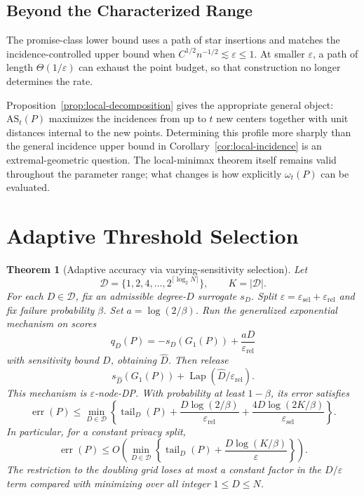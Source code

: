 \documentclass[11pt]{article}
\newtheorem{theorem}{Theorem}[section]
\DeclareMathOperator{\Lap}{Lap}
\newcommand{\eps}{\varepsilon}
\newcommand{\calD}{\mathcal{D}}
\newcommand{\tail}{\operatorname{tail}}
\begin{document}
\subsection{Beyond the Characterized Range}
The promise-class lower bound uses a path of star insertions and matches the incidence-controlled upper bound when \(C^{1/2}n^{-1/2}\lesssim\eps\le1\). At smaller \(\eps\), a path of length \(\Theta(1/\eps)\) can exhaust the point budget, so that construction no longer determines the rate.

Proposition~\ref{prop:local-decomposition} gives the appropriate general object: \(\mathrm{AS}_t(P)\) maximizes the incidences from up to \(t\) new centers together with unit distances internal to the new points. Determining this profile more sharply than the general incidence upper bound in Corollary~\ref{cor:local-incidence} is an extremal-geometric question. The local-minimax theorem itself remains valid throughout the parameter range; what changes is how explicitly \(\omega_t(P)\) can be evaluated.


\section{Adaptive Threshold Selection}
\label{sec:adaptive-selection}

\begin{theorem}[Adaptive accuracy via varying-sensitivity selection]
\label{thm:adaptive}
Let
\[
\calD=\{1,2,4,\ldots,2^{\lceil\log_2 N\rceil}\},\qquad K=|\calD|.
\]
For each \(D\in\calD\), fix an admissible degree-\(D\) surrogate \(s_D\). Split \(\eps=\eps_{\mathrm{sel}}+\eps_{\mathrm{rel}}\) and fix failure probability \(\beta\). Set \(a=\log(2/\beta)\). Run the generalized exponential mechanism on scores
\[
q_D(P)=-s_D(G_1(P))+\frac{aD}{\eps_{\mathrm{rel}}}
\]
with sensitivity bound \(D\), obtaining \(\widehat D\). Then release
\[
s_{\widehat D}(G_1(P))+\Lap(\widehat D/\eps_{\mathrm{rel}}).
\]
This mechanism is \(\eps\)-node-DP. With probability at least \(1-\beta\), its error satisfies
\[
\operatorname{err}(P)\le
\min_{D\in \calD}
\left\{
\tail_D(P)+\frac{D\log(2/\beta)}{\eps_{\mathrm{rel}}}
+\frac{4D\log(2K/\beta)}{\eps_{\mathrm{sel}}}
\right\}.
\]
In particular, for a constant privacy split,
\[
\operatorname{err}(P)\le
O\!\left(\min_{D\in\calD}\left\{\tail_D(P)+\frac{D\log(K/\beta)}{\eps}\right\}\right).
\]
The restriction to the doubling grid loses at most a constant factor in the \(D/\eps\) term compared with minimizing over all integer \(1\le D\le N\).
\end{theorem}
\end{document}
